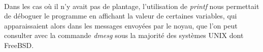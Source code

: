 \paragraph{}Dans les cas où il n'y avait pas de plantage, l'utilisation de
{\em printf} nous permettait de déboguer le programme en affichant la valeur
de certaines variables, qui apparaissaient alors dans les messages envoyées par
le noyau, que l'on peut consulter avec la commande {\em dmesg} sous la majorité
des systèmes UNIX dont FreeBSD.




